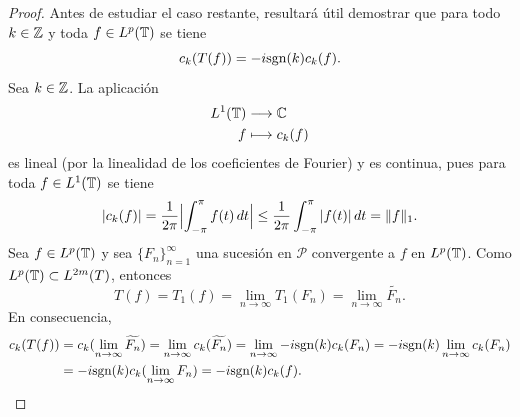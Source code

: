 \documentclass[a4paper, 12pt]{book}
\begin{document}
\begin{proof}
    Antes de estudiar el caso restante, resultará útil demostrar que para todo $k \in \mathbb Z$ y toda $f \in L^p(\mathbb T)$ se tiene
    \[c_k(T(f)) = -i\textup{sgn}(k)c_k(f).\]
    Sea $k\in\mathbb Z$. La aplicación
    \begin{align*}
        L^1(\mathbb T) &\longrightarrow \mathbb C \\
        f &\longmapsto c_k(f)
    \end{align*}
    es lineal (por la linealidad de los coeficientes de Fourier) y es continua, pues para toda $f\in L^{1}(\mathbb T)$ se tiene
    \[|c_k(f)| = \frac{1}{2\pi}\Bigl|\int_{-\pi}^{\pi} f(t) \, dt\Bigr| \leq \frac{1}{2\pi}\int_{-\pi}^{\pi} |f(t)| \, dt = \|f\|_1.\]
    Sea $f \in L^{p}(\mathbb T)$ y sea $\{F_n\}_{n=1}^\infty$ una sucesión en $\mathcal{P}$ convergente a $f$ en $L^{p}(\mathbb T)$. Como $L^p(\mathbb T) \subset L^{2m}(T)$, entonces
    \[T(f) = T_1(f) = \lim_{n\to\infty} T_1(F_n) = \lim_{n\to\infty} \widetilde{F_n}.\]
    En consecuencia,
    \begin{align*}
        c_k(T(f)) &= c_k(\lim_{n\to\infty} \widetilde{F_n}) =\lim_{n\to\infty} c_k(\widetilde{F_n}) = \lim_{n\to\infty} -i\textup{sgn}(k)c_k(F_n) =-i\textup{sgn}(k)\lim_{n\to\infty} c_k(F_n) \\ 
        &= -i\textup{sgn}(k)c_k(\lim_{n\to\infty} F_n) = -i\textup{sgn}(k)c_k(f).
    \end{align*}


\end{proof}
\end{document}
